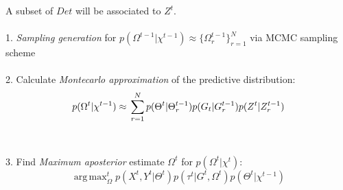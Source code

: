 {A subset  of $Det$ will be associated to $Z^t$.\\ 
\\
1. \textit{Sampling generation} for $p(\Omega^{t-1} |\chi^{t-1}) \approx \{ \Omega_r^{t-1} \}_{r=1}^N$ via MCMC sampling scheme\\
\\
2. Calculate \textit{Montecarlo approximation} of the predictive distribution:\\
$$
 p(\Omega^{t} |\chi^{t-1}) \approx \\ \nonumber
\sum_{r=1}^{N} p(\Theta^{t} | \Theta^{t-1}_r) p(G_t |G^{t-1}_r) p(Z^t |Z^{t-1}_r) 
$$
\\
\\
3. Find \textit{Maximum aposterior} estimate $\Omega^{t}$ for $p(\Omega^{t} |\chi^{t})$:\\
\[
 \operatorname{arg\,max}_\Omega^{t} p(X^{t}, Y^t |\Theta^{t}) p(\tau^{t} | G^t ,\Omega^{t}) p(\Theta^{t} |\chi^{t-1}) 
\]
}\\[.4cm]
\\
\\

